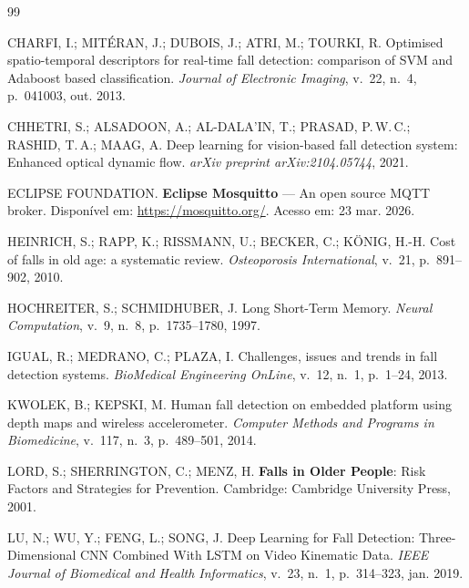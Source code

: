 \documentclass[12pt,a4paper]{article}
\begin{document}
\renewcommand{\refname}{Referências}
\begin{thebibliography}{99}

CHARFI, I.; MITÉRAN, J.; DUBOIS, J.; ATRI, M.; TOURKI, R.
Optimised spatio-temporal descriptors for real-time fall detection: comparison of SVM and Adaboost based classification.
\textit{Journal of Electronic Imaging}, v.~22, n.~4, p.~041003, out. 2013.

CHHETRI, S.; ALSADOON, A.; AL-DALA'IN, T.; PRASAD, P.\,W.\,C.; RASHID, T.\,A.; MAAG, A.
Deep learning for vision-based fall detection system: Enhanced optical dynamic flow.
\textit{arXiv preprint arXiv:2104.05744}, 2021.

ECLIPSE FOUNDATION.
\textbf{Eclipse Mosquitto} — An open source MQTT broker.
Disponível em: \url{https://mosquitto.org/}. Acesso em: 23 mar. 2026.

HEINRICH, S.; RAPP, K.; RISSMANN, U.; BECKER, C.; KÖNIG, H.-H.
Cost of falls in old age: a systematic review.
\textit{Osteoporosis International}, v.~21, p.~891--902, 2010.

HOCHREITER, S.; SCHMIDHUBER, J.
Long Short-Term Memory.
\textit{Neural Computation}, v.~9, n.~8, p.~1735--1780, 1997.

IGUAL, R.; MEDRANO, C.; PLAZA, I.
Challenges, issues and trends in fall detection systems.
\textit{BioMedical Engineering OnLine}, v.~12, n.~1, p.~1--24, 2013.

KWOLEK, B.; KEPSKI, M.
Human fall detection on embedded platform using depth maps and wireless accelerometer.
\textit{Computer Methods and Programs in Biomedicine}, v.~117, n.~3, p.~489--501, 2014.

LORD, S.; SHERRINGTON, C.; MENZ, H.
\textbf{Falls in Older People}: Risk Factors and Strategies for Prevention.
Cambridge: Cambridge University Press, 2001.

LU, N.; WU, Y.; FENG, L.; SONG, J.
Deep Learning for Fall Detection: Three-Dimensional CNN Combined With LSTM on Video Kinematic Data.
\textit{IEEE Journal of Biomedical and Health Informatics}, v.~23, n.~1, p.~314--323, jan. 2019.


\end{thebibliography}
\end{document}
